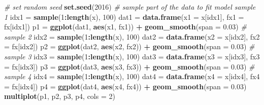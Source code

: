 \documentclass[12pt,]{krantz}
\newenvironment{Shaded}{\begin{snugshade}}{\end{snugshade}}
\newcommand{\KeywordTok}[1]{\textcolor[rgb]{0.13,0.29,0.53}{\textbf{#1}}}
\newcommand{\DataTypeTok}[1]{\textcolor[rgb]{0.13,0.29,0.53}{#1}}
\newcommand{\DecValTok}[1]{\textcolor[rgb]{0.00,0.00,0.81}{#1}}
\newcommand{\FloatTok}[1]{\textcolor[rgb]{0.00,0.00,0.81}{#1}}
\newcommand{\StringTok}[1]{\textcolor[rgb]{0.31,0.60,0.02}{#1}}
\newcommand{\CommentTok}[1]{\textcolor[rgb]{0.56,0.35,0.01}{\textit{#1}}}
\newcommand{\OperatorTok}[1]{\textcolor[rgb]{0.81,0.36,0.00}{\textbf{#1}}}
\newcommand{\NormalTok}[1]{#1}
\theoremstyle{definition}
\theoremstyle{definition}
\theoremstyle{definition}
\theoremstyle{remark}
\begin{document}
\begin{Shaded}
\begin{Highlighting}[]
\CommentTok{# set random seed}
\KeywordTok{set.seed}\NormalTok{(}\DecValTok{2016}\NormalTok{)}
\CommentTok{# sample part of the data to fit model sample 1}
\NormalTok{idx1 =}\StringTok{ }\KeywordTok{sample}\NormalTok{(}\DecValTok{1}\OperatorTok{:}\KeywordTok{length}\NormalTok{(x), }\DecValTok{100}\NormalTok{)}
\NormalTok{dat1 =}\StringTok{ }\KeywordTok{data.frame}\NormalTok{(}\DataTypeTok{x1 =}\NormalTok{ x[idx1], }\DataTypeTok{fx1 =}\NormalTok{ fx[idx1])}
\NormalTok{p1 =}\StringTok{ }\KeywordTok{ggplot}\NormalTok{(dat1, }\KeywordTok{aes}\NormalTok{(x1, fx1)) }\OperatorTok{+}\StringTok{ }\KeywordTok{geom_smooth}\NormalTok{(}\DataTypeTok{span =} \FloatTok{0.03}\NormalTok{)}
\CommentTok{# sample 2}
\NormalTok{idx2 =}\StringTok{ }\KeywordTok{sample}\NormalTok{(}\DecValTok{1}\OperatorTok{:}\KeywordTok{length}\NormalTok{(x), }\DecValTok{100}\NormalTok{)}
\NormalTok{dat2 =}\StringTok{ }\KeywordTok{data.frame}\NormalTok{(}\DataTypeTok{x2 =}\NormalTok{ x[idx2], }\DataTypeTok{fx2 =}\NormalTok{ fx[idx2])}
\NormalTok{p2 =}\StringTok{ }\KeywordTok{ggplot}\NormalTok{(dat2, }\KeywordTok{aes}\NormalTok{(x2, fx2)) }\OperatorTok{+}\StringTok{ }\KeywordTok{geom_smooth}\NormalTok{(}\DataTypeTok{span =} \FloatTok{0.03}\NormalTok{)}
\CommentTok{# sample 3}
\NormalTok{idx3 =}\StringTok{ }\KeywordTok{sample}\NormalTok{(}\DecValTok{1}\OperatorTok{:}\KeywordTok{length}\NormalTok{(x), }\DecValTok{100}\NormalTok{)}
\NormalTok{dat3 =}\StringTok{ }\KeywordTok{data.frame}\NormalTok{(}\DataTypeTok{x3 =}\NormalTok{ x[idx3], }\DataTypeTok{fx3 =}\NormalTok{ fx[idx3])}
\NormalTok{p3 =}\StringTok{ }\KeywordTok{ggplot}\NormalTok{(dat3, }\KeywordTok{aes}\NormalTok{(x3, fx3)) }\OperatorTok{+}\StringTok{ }\KeywordTok{geom_smooth}\NormalTok{(}\DataTypeTok{span =} \FloatTok{0.03}\NormalTok{)}
\CommentTok{# sample 4}
\NormalTok{idx4 =}\StringTok{ }\KeywordTok{sample}\NormalTok{(}\DecValTok{1}\OperatorTok{:}\KeywordTok{length}\NormalTok{(x), }\DecValTok{100}\NormalTok{)}
\NormalTok{dat4 =}\StringTok{ }\KeywordTok{data.frame}\NormalTok{(}\DataTypeTok{x4 =}\NormalTok{ x[idx4], }\DataTypeTok{fx4 =}\NormalTok{ fx[idx4])}
\NormalTok{p4 =}\StringTok{ }\KeywordTok{ggplot}\NormalTok{(dat4, }\KeywordTok{aes}\NormalTok{(x4, fx4)) }\OperatorTok{+}\StringTok{ }\KeywordTok{geom_smooth}\NormalTok{(}\DataTypeTok{span =} \FloatTok{0.03}\NormalTok{)}
\KeywordTok{multiplot}\NormalTok{(p1, p2, p3, p4, }\DataTypeTok{cols =} \DecValTok{2}\NormalTok{)}
\end{Highlighting}
\end{Shaded}
\end{document}
